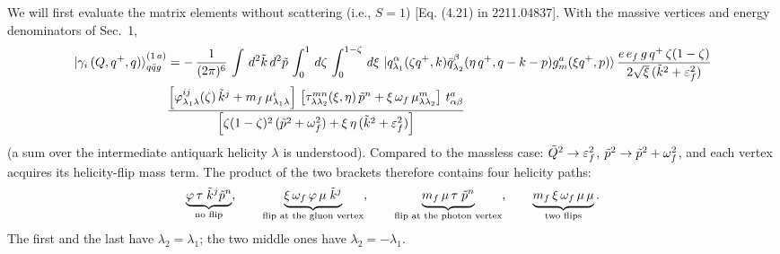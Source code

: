 \documentclass[9pt]{article}
\newcommand{\eps}{\varepsilon_{f}}           %
\newcommand{\om}{\omega_{f}}                 %
\numberwithin{equation}{section}
\begin{document}
\begin{enumerate}
We will first evaluate the matrix elements without scattering (i.e., $S = 1$) [Eq. (4.21) in 2211.04837]. With the massive vertices and energy denominators of Sec.~1,
\begin{align}
    \ket{\gamma_{i}\,(Q,q^{+},q)}^{(1\,a)}_{q\Bar{q}g} & = -\,\frac{1}{(2\pi)^{6}}\, \int\, d^{2}\Tilde{k}\, d^{2}\Tilde{p}\, \int_{0}^{1}\, d\zeta\, \int_{0}^{1-\zeta}\, d\xi\,\ket{q^{\alpha}_{\lambda_{1}}(\zeta q^{+},k)\Bar{q}^{\beta}_{\lambda_{2}}(\eta\,q^{+},q-k-p)g^{a}_{m}(\xi q^{+},p)} \frac{e\,e_{f}\,g\,q^{+}\,\zeta(1-\zeta)}{2\sqrt{\xi}\,(\Tilde{k}^{2}+\eps^{2})}\notag \\ & \frac{\left[\varphi^{ij}_{\lambda_{1}\lambda}(\zeta)\, \Tilde{k}^{j}+m_{f}\,\mu^{i}_{\lambda_{1}\lambda}\right]\,\left[\tau^{mn}_{\lambda \lambda_{2}}(\xi,\eta)\, \Tilde{p}^{n}+\xi\,\om\,\mu^{m}_{\lambda\lambda_{2}}\right]\, t^{a}_{\alpha\beta}}{\left[\zeta(1-\zeta)^{2}\, (\Tilde{p}^{2}+\om^{2}) +\xi\,\eta\,(\Tilde{k}^{2}+\eps^{2})\right]}
\end{align}
(a sum over the intermediate antiquark helicity $\lambda$ is understood). Compared to the massless case: $\Tilde{Q}^{2}\rightarrow\eps^{2}$, $\Tilde{p}^{2}\rightarrow\Tilde{p}^{2}+\om^{2}$, and each vertex acquires its helicity-flip mass term. The product of the two brackets therefore contains four helicity paths:
$$\underbrace{\varphi\,\tau\;\Tilde{k}^{j}\Tilde{p}^{n}}_{\text{no flip}},\hspace{2em} \underbrace{\xi\,\om\,\varphi\,\mu\;\Tilde{k}^{j}}_{\text{flip at the gluon vertex}},\hspace{2em} \underbrace{m_{f}\,\mu\,\tau\;\Tilde{p}^{n}}_{\text{flip at the photon vertex}},\hspace{2em} \underbrace{m_{f}\,\xi\,\om\,\mu\,\mu}_{\text{two flips}} .$$
The first and the last have $\lambda_{2}=\lambda_{1}$; the two middle ones have $\lambda_{2}=-\lambda_{1}$.


\end{enumerate}
\end{document}
